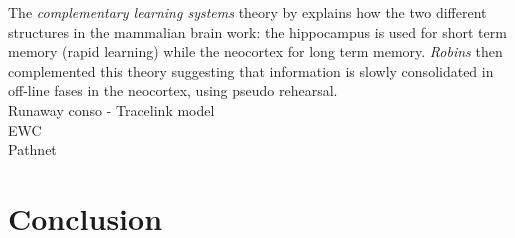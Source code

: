 \documentclass{article}
\begin{document}
The \textit{complementary learning systems} theory by \citep{McClelland1995WhyMemory.} explains how the two different structures in the mammalian brain work: the hippocampus is used for short term memory (rapid learning) while the neocortex for long term memory. \textit{Robins} then complemented this theory suggesting that information is slowly consolidated in off-line fases in the neocortex, using pseudo rehearsal. \\

Runaway conso - Tracelink model\\
\vspace{1cm}
EWC\\

\vspace{1cm}
Pathnet\\




\section{Conclusion}















\newpage
\end{document}

